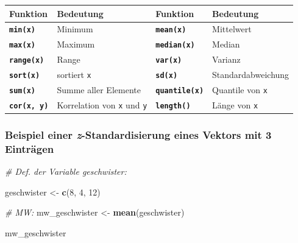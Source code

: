 \documentclass[
  ngerman,
]{book}
\newenvironment{Shaded}{\begin{snugshade}}{\end{snugshade}}
\newcommand{\CommentTok}[1]{\textcolor[rgb]{0.56,0.35,0.01}{\textit{#1}}}
\newcommand{\DecValTok}[1]{\textcolor[rgb]{0.00,0.00,0.81}{#1}}
\newcommand{\FunctionTok}[1]{\textcolor[rgb]{0.13,0.29,0.53}{\textbf{#1}}}
\newcommand{\NormalTok}[1]{#1}
\newcommand{\OtherTok}[1]{\textcolor[rgb]{0.56,0.35,0.01}{#1}}
\begin{document}
\begin{longtable}[]{@{}
  >{\centering\arraybackslash}p{}
  >{\centering\arraybackslash}p{}
  >{\centering\arraybackslash}p{}
  >{\centering\arraybackslash}p{}@{}}
\toprule\noalign{}
\begin{minipage}[b]{\linewidth}\centering
Funktion
\end{minipage} & \begin{minipage}[b]{\linewidth}\centering
Bedeutung
\end{minipage} & \begin{minipage}[b]{\linewidth}\centering
Funktion
\end{minipage} & \begin{minipage}[b]{\linewidth}\centering
Bedeutung
\end{minipage} \\
\midrule\noalign{}
\endhead
\bottomrule\noalign{}
\endlastfoot
\textbf{\texttt{min(x)}} & Minimum & \textbf{\texttt{mean(x)}} & Mittelwert \\
\textbf{\texttt{max(x)}} & Maximum & \textbf{\texttt{median(x)}} & Median \\
\textbf{\texttt{range(x)}} & Range & \textbf{\texttt{var(x)}} & Varianz \\
\textbf{\texttt{sort(x)}} & sortiert \texttt{x} & \textbf{\texttt{sd(x)}} & Standardabweichung \\
\textbf{\texttt{sum(x)}} & Summe aller
Elemente & \textbf{\texttt{quantile(x)}} & Quantile von \texttt{x} \\
\textbf{\texttt{cor(x,\ y)}} & Korrelation
von \texttt{x} und \texttt{y} & \textbf{\texttt{length()}} & Länge von \texttt{x} \\
\end{longtable}

\subsubsection{\texorpdfstring{Beispiel einer \emph{z}-Standardisierung eines Vektors mit 3 Einträgen}{Beispiel einer z-Standardisierung eines Vektors mit 3 Einträgen}}\label{beispiel-einer-z-standardisierung-eines-vektors-mit-3-eintruxe4gen}

\begin{Shaded}
\begin{Highlighting}[]
\CommentTok{\# Def. der Variable geschwister:}

\NormalTok{geschwister }\OtherTok{\textless{}{-}} \FunctionTok{c}\NormalTok{(}\DecValTok{8}\NormalTok{, }\DecValTok{4}\NormalTok{, }\DecValTok{12}\NormalTok{)}

\CommentTok{\# MW:}
\NormalTok{mw\_geschwister }\OtherTok{\textless{}{-}} \FunctionTok{mean}\NormalTok{(geschwister)}

\NormalTok{mw\_geschwister}
\end{Highlighting}
\end{Shaded}
\end{document}
